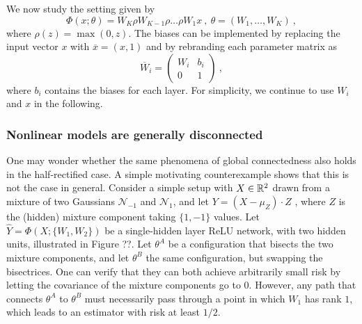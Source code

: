 We now study the setting given by 
\begin{equation}
\label{relucase}
\Phi(x;\theta) = W_K \rho W_{K-1} \rho \dots \rho W_1 x~,~\theta = (W_1, \dots, W_K)~,
\end{equation}
where $\rho(z) = \max(0 ,z)$. 
The biases can be implemented by replacing the input vector $x$ 
with $\overline{x}=(x, 1)$ and by rebranding each parameter matrix as 
$$\overline{W}_i = \left( 
\begin{array}{c|c}
W_i & b_i \\
\hline 
0 & 1 
\end{array}
\right)~,$$
where $b_i$ contains the biases for each layer.	
For simplicity, we continue to use $W_i$ and $x$ in the following.

\subsubsection{Nonlinear models are generally disconnected}

One may wonder whether the same phenomena of global connectedness also holds 
in the half-rectified case. A simple motivating counterexample shows that this is not the case in 
general. Consider a simple setup with $X \in {\mathbb{R}}^2$ drawn from a mixture of two Gaussians $\mathcal{N}_{-1}$ 
and $\mathcal{N}_{1}$, and let $Y = (X-\mu_Z) \cdot Z $ , where $Z$ is the (hidden) mixture component taking $\{1,-1\}$ values.  Let 
$\hat{Y} = \Phi(X; \{ W_1, W_2\} )$ be a single-hidden layer ReLU network, with two hidden units, 
illustrated in Figure ??. 
Let $\theta^A$ be a configuration that bisects the two mixture components, 
and let $\theta^B$ the same configuration, but swapping the bisectrices. 
One can verify that they can both achieve arbitrarily small risk by letting the covariance of the mixture components go to $0$. 
However, any path that connects $\theta^A$ to $\theta^B$ 
must necessarily pass through a point in which $W_1$ has rank $1$, which leads to an estimator with risk at least $1/2$.  

